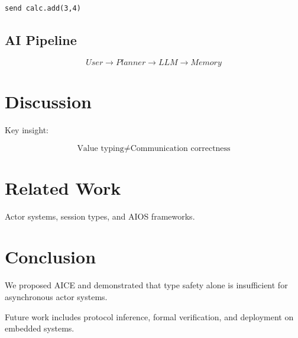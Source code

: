 \documentclass[11pt]{article}
\begin{document}
\begin{lstlisting}
send calc.add(3,4)
\end{lstlisting}

\subsection{AI Pipeline}

\[
User \rightarrow Planner \rightarrow LLM \rightarrow Memory
\]

\section{Discussion}

Key insight:

\[
\text{Value typing} \neq \text{Communication correctness}
\]

\section{Related Work}

Actor systems, session types, and AIOS frameworks.

\section{Conclusion}

We proposed AICE and demonstrated that type safety alone is insufficient for asynchronous actor systems.

Future work includes protocol inference, formal verification, and deployment on embedded systems.



\end{document}
